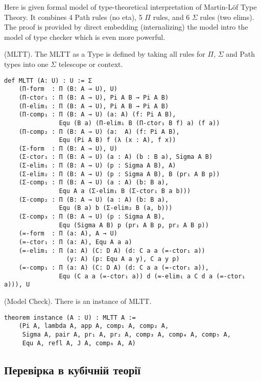 Here is given formal model of type-theoretical interpretation of Martin-Löf Type Theory.
It combines 4 Path rules (no eta), 5 $\Pi$ rules, and 6 $\Sigma$ rules (two elims).
The proof is provided by direct embedding (internalizing) the model intro the model
of type checker which is even more powerful.

\begin{definition} (MLTT).
The MLTT as a Type is defined by taking all rules
for $\Pi$, $\Sigma$ and Path types into one $\Sigma$ telescope or context.
\end{definition}

\begin{lstlisting}
def MLTT (A: U) : U := Σ
    (Π-form  : Π (B: A → U), U)
    (Π-ctor₁ : Π (B: A → U), Pi A B → Pi A B)
    (Π-elim₁ : Π (B: A → U), Pi A B → Pi A B)
    (Π-comp₁ : Π (B: A → U) (a: A) (f: Pi A B),
               Equ (B a) (Π-elim₁ B (Π-ctor₁ B f) a) (f a))
    (Π-comp₂ : Π (B: A → U) (a:  A) (f: Pi A B),
               Equ (Pi A B) f (λ (x : A), f x))
    (Σ-form  : Π (B: A → U), U)
    (Σ-ctor₁ : Π (B: A → U) (a : A) (b : B a), Sigma A B)
    (Σ-elim₁ : Π (B: A → U) (p : Sigma A B), A)
    (Σ-elim₂ : Π (B: A → U) (p : Sigma A B), B (pr₁ A B p))
    (Σ-comp₁ : Π (B: A → U) (a : A) (b: B a),
               Equ A a (Σ-elim₁ B (Σ-ctor₁ B a b)))
    (Σ-comp₂ : Π (B: A → U) (a : A) (b: B a),
               Equ (B a) b (Σ-elim₂ B (a, b)))
    (Σ-comp₃ : Π (B: A → U) (p : Sigma A B),
               Equ (Sigma A B) p (pr₁ A B p, pr₂ A B p))
    (=-form  : Π (a: A), A → U)
    (=-ctor₁ : Π (a: A), Equ A a a)
    (=-elim₁ : Π (a: A) (C: D A) (d: C a a (=-ctor₁ a))
                 (y: A) (p: Equ A a y), C a y p)
    (=-comp₁ : Π (a: A) (C: D A) (d: C a a (=-ctor₁ a)),
               Equ (C a a (=-ctor₁ a)) d (=-elim₁ a C d a (=-ctor₁ a))), U
\end{lstlisting}

\begin{theorem} (Model Check).
There is an instance of MLTT.
\begin{lstlisting}
theorem instance (A : U) : MLTT A :=
    (Pi A, lambda A, app A, comp₁ A, comp₂ A,
     Sigma A, pair A, pr₁ A, pr₂ A, comp₃ A, comp₄ A, comp₅ A,
     Equ A, refl A, J A, comp₆ A, A)
\end{lstlisting}
\end{theorem}

\newpage
\subsection*{Перевірка в кубічній теорії}

